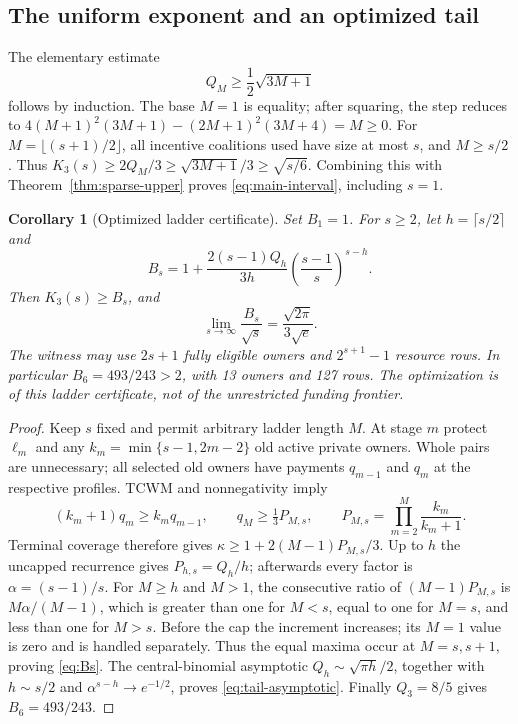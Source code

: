 \documentclass[11pt]{article}
\newtheorem{corollary}[theorem]{Corollary}
\theoremstyle{definition}\newtheorem{definition}[theorem]{Definition}
\theoremstyle{remark}\newtheorem{remark}[theorem]{Remark}
\begin{document}
\subsection{The uniform exponent and an optimized tail}
The elementary estimate
\begin{equation}\label{eq:central-bound}
 Q_M\ge\frac12\sqrt{3M+1}
\end{equation}
follows by induction. The base $M=1$ is equality; after squaring, the step
reduces to
$4(M+1)^2(3M+1)-(2M+1)^2(3M+4)=M\ge0$.
For $M=\lfloor(s+1)/2\rfloor$, all incentive coalitions used have size at
most $s$, and $M\ge s/2$. Thus
$K_3(s)\ge2Q_M/3\ge\sqrt{3M+1}/3\ge\sqrt{s/6}$.
Combining this with Theorem~\ref{thm:sparse-upper} proves
\eqref{eq:main-interval}, including $s=1$.

\begin{corollary}[Optimized ladder certificate]\label{cor:tail}
Set $B_1=1$. For $s\ge2$, let $h=\lceil s/2\rceil$ and
\begin{equation}\label{eq:Bs}
 B_s=1+\frac{2(s-1)Q_h}{3h}
            \left(\frac{s-1}{s}\right)^{s-h}.
\end{equation}
Then $K_3(s)\ge B_s$, and
\begin{equation}\label{eq:tail-asymptotic}
 \lim_{s\to\infty}\frac{B_s}{\sqrt s}
   =\frac{\sqrt{2\pi}}{3\sqrt e}.
\end{equation}
The witness may use $2s+1$ fully eligible owners and $2^{s+1}-1$ resource
rows. In particular $B_6=493/243>2$, with 13 owners and 127 rows.
The optimization is of this ladder certificate, not of the unrestricted
funding frontier.
\end{corollary}
\begin{proof}
Keep $s$ fixed and permit arbitrary ladder length $M$. At stage $m$ protect
$\ell_m$ and any $k_m=\min\{s-1,2m-2\}$ old active private owners. Whole
pairs are unnecessary; all selected old owners have payments $q_{m-1}$ and
$q_m$ at the respective profiles. TCWM and nonnegativity imply
\[
 (k_m+1)q_m\ge k_m q_{m-1},\qquad
 q_M\ge\tfrac13 P_{M,s},\qquad
 P_{M,s}=\prod_{m=2}^M\frac{k_m}{k_m+1}.
\]
Terminal coverage therefore gives
$\kappa\ge1+2(M-1)P_{M,s}/3$.
Up to $h$ the uncapped recurrence gives $P_{h,s}=Q_h/h$; afterwards every
factor is $\alpha=(s-1)/s$. For $M\ge h$ and $M>1$, the consecutive ratio
of $(M-1)P_{M,s}$ is $M\alpha/(M-1)$, which is greater than one for $M<s$,
equal to one for $M=s$, and less than one for $M>s$.
Before the cap the increment increases; its $M=1$ value is zero and is
handled separately. Thus the equal maxima occur at $M=s,s+1$, proving
\eqref{eq:Bs}. The central-binomial asymptotic
$Q_h\sim\sqrt{\pi h}/2$, together with $h\sim s/2$ and
$\alpha^{s-h}\to e^{-1/2}$, proves \eqref{eq:tail-asymptotic}.
Finally $Q_3=8/5$ gives $B_6=493/243$.
\end{proof}
\end{document}
